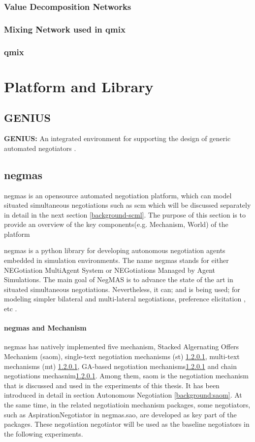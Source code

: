 \subsubsection{Value Decomposition Networks}

\subsubsection{Mixing Network used in \gls{qmix}}

\subsubsection{\gls{qmix}}

\section{Platform and Library}
\subsection{GENIUS}
\textbf{GENIUS:} An integrated environment for supporting the design of generic automated negotiators \parencite{Lin2014}.

\subsection{\gls{negmas}} \label{background:negmas}
\gls{negmas} is an opensource automated negotiation platform, which can model situated simultaneous negotiations such as \gls{scm} which will be discussed separately in detail in the next section \ref{background-scml}. The purpose of this section is to provide an overview of the key components(e.g. Mechanism, World) of the platform

\gls{negmas} is a python library for developing autonomous negotiation agents embedded in simulation environments. The name negmas stands for either NEGotiation MultiAgent System or NEGotiations Managed by Agent Simulations. The main goal of NegMAS is to advance the state of the art in situated simultaneous negotiations. Nevertheless, it can; and is being used; for modeling simpler bilateral and multi-lateral negotiations, preference elicitation , etc \parencite{Mohammad2019}.

\paragraph{\gls{negmas} and Mechanism}
\gls{negmas} has natively implemented five mechanism, Stacked Algernating Offers Mechanism (\gls{saom}), single-text negotiation mechanisms (st) \ref{}, multi-text mechanisms (mt) \ref{}, GA-based negotiation mechanisms\ref{} and chain negotiations mechasnim\ref{}. Among them, \gls{saom} is the negotiation mechanism that is discussed and used in the experiments of this thesis. It has been introduced in detail in section Autonomous Negotiation \ref{background:saom}. At the same time, in the related negotiatioin mechanism packages, some negotiators, such as AspirationNegotiator in negmas.sao, are developed as key part of the packages. These negotiation negotiator will be used as the baseline negotiators in the following experiments.

